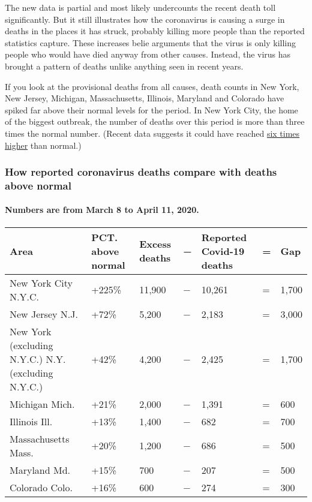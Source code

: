 The new data is partial and most likely undercounts the recent death
toll significantly. But it still illustrates how the coronavirus is
causing a surge in deaths in the places it has struck, probably killing
more people than the reported statistics capture. These increases belie
arguments that the virus is only killing people who would have died
anyway from other causes. Instead, the virus has brought a pattern of
deaths unlike anything seen in recent years.

If you look at the provisional deaths from all causes, death counts in
New York, New Jersey, Michigan, Massachusetts, Illinois, Maryland and
Colorado have spiked far above their normal levels for the period. In
New York City, the home of the biggest outbreak, the number of deaths
over this period is more than three times the normal number. (Recent
data suggests it could have reached
\href{https://www.nytimes.com/interactive/2020/04/27/upshot/coronavirus-deaths-new-york-city.html}{six
times higher} than normal.)

\hypertarget{how-reported-coronavirus-deaths-compare-with-deaths-above-normal}{%
\subsubsection{How reported coronavirus deaths compare with deaths above
normal}\label{how-reported-coronavirus-deaths-compare-with-deaths-above-normal}}

\hypertarget{numbers-are-from-march-8-to-april-11-2020}{%
\paragraph{Numbers are from March 8 to April 11,
2020.}\label{numbers-are-from-march-8-to-april-11-2020}}

\begin{longtable}[]{@{}lllllll@{}}
\toprule
Area & PCT. above normal & Excess deaths & − & Reported Covid-19 deaths
& = & Gap\tabularnewline
\midrule
\endhead
New York City N.Y.C. & +225\% & 11,900 & − & 10,261 & = &
1,700\tabularnewline
New Jersey N.J. & +72\% & 5,200 & − & 2,183 & = & 3,000\tabularnewline
New York (excluding N.Y.C.) N.Y. (excluding N.Y.C.) & +42\% & 4,200 & −
& 2,425 & = & 1,700\tabularnewline
Michigan Mich. & +21\% & 2,000 & − & 1,391 & = & 600\tabularnewline
Illinois Ill. & +13\% & 1,400 & − & 682 & = & 700\tabularnewline
Massachusetts Mass. & +20\% & 1,200 & − & 686 & = & 500\tabularnewline
Maryland Md. & +15\% & 700 & − & 207 & = & 500\tabularnewline
Colorado Colo. & +16\% & 600 & − & 274 & = & 300\tabularnewline
\bottomrule
\end{longtable}

